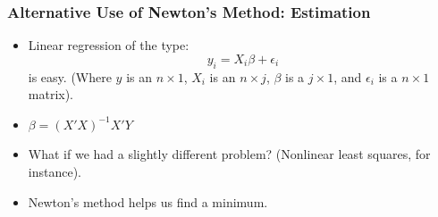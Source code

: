 \documentclass{beamer}
\begin{document}



\begin{frame}
\frametitle[alignment=center]{Alternative Use of Newton's Method: Estimation}
\begin{itemize}
\item Linear regression of the type:
\bigskip
$$y_{i}=X_i\beta+\epsilon_i$$
\bigskip
is easy. (Where $y$ is an $n\times1$, $X_i$ is an $n\times j$, $\beta$ is a $j\times 1$, and $\epsilon_i$ is a $n\times1$ matrix).
\bigskip
\item $\beta=(X'X)^{-1}X'Y$
\bigskip
\item What if we had a slightly different problem?  (Nonlinear least squares, for instance).
\bigskip
\item Newton's method helps us find a minimum.
\end{itemize}
\end{frame}
\end{document}
